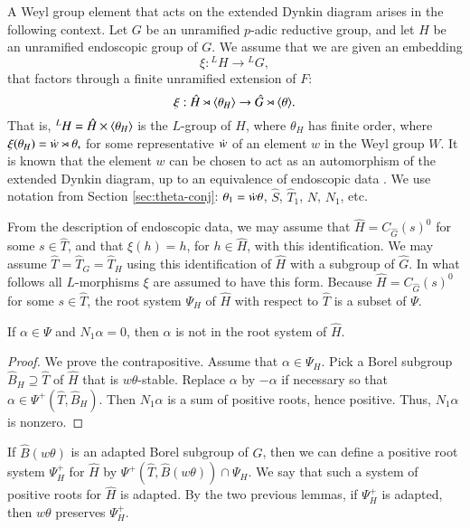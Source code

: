 A Weyl group element that acts on the extended Dynkin diagram arises
in the following context.  Let $G$ be an unramified $p$-adic reductive
group, and let $H$ be an unramified endoscopic group of $G$.  We
assume that we are given an embedding
\[
\xi:{}^LH\to {}^LG,
\]
that factors through a finite unramified extension of $F$:
\[
\xi:\hat H\rtimes \langle{\theta_H}\rangle\to \hat G\rtimes \langle{\theta}\rangle.
\]
That is, ${}^LH = \hat H\times \langle{\theta_H}\rangle$ is the $L$-group of
$H$, where $\theta_H$ has finite order, where
$\xi(\theta_H) = \dot w \rtimes \theta,$ for some representative
$\dot w $ of an element $w$ in the Weyl group $W$.  It is known that
the element $w$ can be chosen to act as an automorphism of the
extended Dynkin diagram, up to an equivalence of endoscopic data
\cite[\S4.7]{hales1993simple}.  We use notation from Section
\ref{sec:theta-conj}: $\theta_1 = \dot w\theta$, $\hat S$, $\hat T_1$,
$N$, $N_1$, etc.

From the description of endoscopic data, we may assume that
$\hat H = C_{\hat G}(s)^0$ for some $s\in \hat T$, and that
$\xi(h) = h$, for $h \in \hat H$, with this identification.  We may
assume $\hat T = \hat T_G = \hat T_H$ using this identification of
$\hat H$ with a subgroup of $\hat G$.  In what follows all
$L$-morphisms $\xi$ are assumed to have this form.  Because
$\hat H = C_{\hat G}(s)^0$ for some $s\in \hat T$, the root system
$\Psi_H$ of $\hat H$ with respect to $\hat T$ is a subset of $\Psi$.

\begin{lemma}   If $\alpha\in \Psi$ and  $N_1\alpha=0$, then
$\alpha$ is not in the root system of $\hat H$.
\end{lemma}

\begin{proof} We prove the contrapositive.  Assume that
  $\alpha\in\Psi_H$.  Pick a Borel subgroup $\hat B_H\supseteq \hat T$
  of $\hat H$ that is $w\theta$-stable.  Replace $\alpha$ by $-\alpha$
  if necessary so that $\alpha\in\Psi^+(\hat T,\hat B_H)$.  Then
  $N_1\alpha$ is a sum of positive roots, hence positive.  Thus,
  $N_1\alpha$ is nonzero.
\end{proof}

If $\hat B(w\theta)$ is an adapted Borel subgroup of $\hat G$, then we
can define a positive root system $\Psi_H^+$ for $\hat H$ by
$\Psi^+(\hat T,\hat B(w\theta))\cap \Psi_H$.  We say that such a
system of positive roots for $\hat H$ is adapted.  By the two previous
lemmas, if $\Psi^+_H$ is adapted, then $w\theta$ preserves $\Psi^+_H$.

